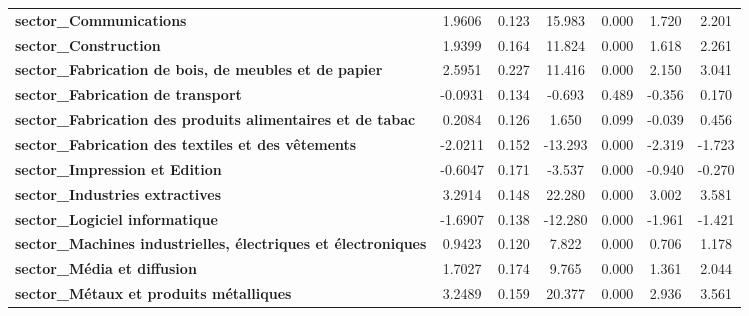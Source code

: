 \begin{center}
\begin{tabular}{lcccccc}
\textbf{sector\_Communications}                                       &       1.9606  &        0.123     &    15.983  &         0.000        &        1.720    &        2.201     \\
\textbf{sector\_Construction}                                         &       1.9399  &        0.164     &    11.824  &         0.000        &        1.618    &        2.261     \\
\textbf{sector\_Fabrication de bois, de meubles et de papier}         &       2.5951  &        0.227     &    11.416  &         0.000        &        2.150    &        3.041     \\
\textbf{sector\_Fabrication de transport}                             &      -0.0931  &        0.134     &    -0.693  &         0.489        &       -0.356    &        0.170     \\
\textbf{sector\_Fabrication des produits alimentaires et de tabac}    &       0.2084  &        0.126     &     1.650  &         0.099        &       -0.039    &        0.456     \\
\textbf{sector\_Fabrication des textiles et des vêtements}            &      -2.0211  &        0.152     &   -13.293  &         0.000        &       -2.319    &       -1.723     \\
\textbf{sector\_Impression et Edition}                                &      -0.6047  &        0.171     &    -3.537  &         0.000        &       -0.940    &       -0.270     \\
\textbf{sector\_Industries extractives}                               &       3.2914  &        0.148     &    22.280  &         0.000        &        3.002    &        3.581     \\
\textbf{sector\_Logiciel informatique}                                &      -1.6907  &        0.138     &   -12.280  &         0.000        &       -1.961    &       -1.421     \\
\textbf{sector\_Machines industrielles, électriques et électroniques} &       0.9423  &        0.120     &     7.822  &         0.000        &        0.706    &        1.178     \\
\textbf{sector\_Média et diffusion}                                   &       1.7027  &        0.174     &     9.765  &         0.000        &        1.361    &        2.044     \\
\textbf{sector\_Métaux et produits métalliques}                       &       3.2489  &        0.159     &    20.377  &         0.000        &        2.936    &        3.561     \\

\end{tabular}
\end{center}
